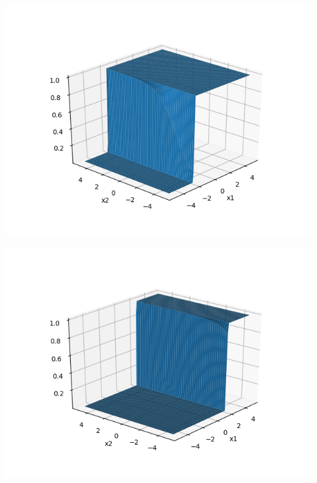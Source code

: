\documentclass[solution,addpoints,12pt]{exam}
\begin{document}
\begin{questions}
\begin{parts}
\begin{solution}
                  		\begin{center}
                  			\includegraphics[scale=0.8]{h_13}
                  			\label{fig:h13}
                  		\end{center}
                  		
                  		\begin{center}
                  			\includegraphics[scale=0.8]{h_14}
                  			\label{fig:h14}
                  		\end{center}
                  		

\end{solution}
\end{parts}
\end{questions}
\end{document}
